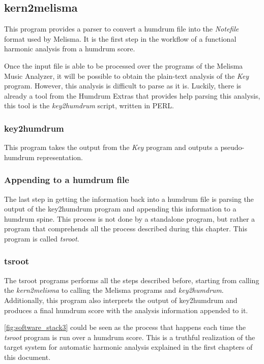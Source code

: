   \subsection{kern2melisma}
    This program provides a parser to convert a humdrum file into the \emph{Notefile} format used by Melisma. It is the first step in the workflow of a functional harmonic analysis from a humdrum score.

  Once the input file is able to be processed over the programs of the Melisma Music Analyzer, it will be possible to obtain the plain-text analysis of the \emph{Key} program. However, this analysis is difficult to parse as it is. Luckily, there is already a tool from the Humdrum Extras that provides help parsing this analysis, this tool is the \emph{key2humdrum} script, written in PERL.

  \subsubsection{key2humdrum}
    This program takes the output from the \emph{Key} program and outputs a pseudo-humdrum representation.

  \subsubsection{Appending to a humdrum file}
    The last step in getting the information back into a humdrum file is parsing the output of the key2humdrum program and appending this information to a humdrum spine. This process is not done by a standalone program, but rather a program that comprehends all the process described during this chapter. This program is called \emph{tsroot}.

  \subsubsection{tsroot}
    The tsroot programs performs all the steps described before, starting from calling the \emph{kern2melisma} to calling the Melisma programs and \emph{key2humdrum}. Additionally, this program also interprets the output of key2humdrum and produces a final humdrum score with the analysis information appended to it.

    \autoref{fig:software_stack3} could be seen as the process that happens each time the \emph{tsroot} program is run over a humdrum score. This is a truthful realization of the target system for automatic harmonic analysis explained in the first chapters of this document.

\newpage
